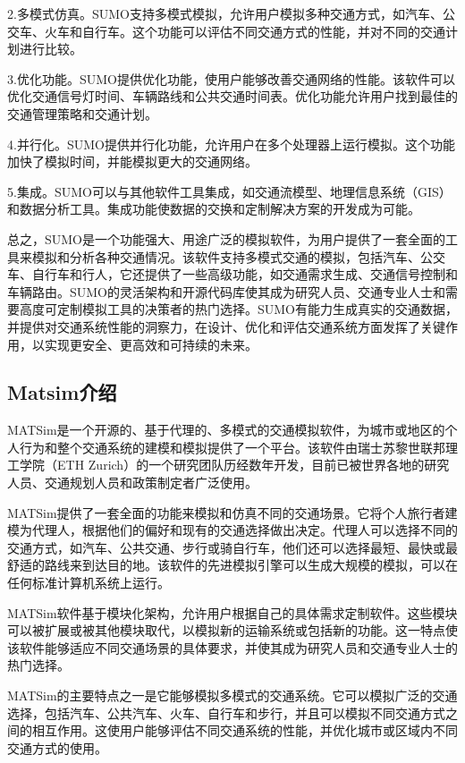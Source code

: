 2.多模式仿真。SUMO支持多模式模拟，允许用户模拟多种交通方式，如汽车、公交车、火车和自行车。这个功能可以评估不同交通方式的性能，并对不同的交通计划进行比较。

3.优化功能。SUMO提供优化功能，使用户能够改善交通网络的性能。该软件可以优化交通信号灯时间、车辆路线和公共交通时间表。优化功能允许用户找到最佳的交通管理策略和交通计划。

4.并行化。SUMO提供并行化功能，允许用户在多个处理器上运行模拟。这个功能加快了模拟时间，并能模拟更大的交通网络。

5.集成。SUMO可以与其他软件工具集成，如交通流模型、地理信息系统（GIS）和数据分析工具。集成功能使数据的交换和定制解决方案的开发成为可能。

总之，SUMO是一个功能强大、用途广泛的模拟软件，为用户提供了一套全面的工具来模拟和分析各种交通情况。该软件支持多模式交通的模拟，包括汽车、公交车、自行车和行人，它还提供了一些高级功能，如交通需求生成、交通信号控制和车辆路由。SUMO的灵活架构和开源代码库使其成为研究人员、交通专业人士和需要高度可定制模拟工具的决策者的热门选择。SUMO有能力生成真实的交通数据，并提供对交通系统性能的洞察力，在设计、优化和评估交通系统方面发挥了关键作用，以实现更安全、更高效和可持续的未来。

\subsection{Matsim介绍}

MATSim是一个开源的、基于代理的、多模式的交通模拟软件，为城市或地区的个人行为和整个交通系统的建模和模拟提供了一个平台。该软件由瑞士苏黎世联邦理工学院（ETH Zurich）的一个研究团队历经数年开发，目前已被世界各地的研究人员、交通规划人员和政策制定者广泛使用。

MATSim提供了一套全面的功能来模拟和仿真不同的交通场景。它将个人旅行者建模为代理人，根据他们的偏好和现有的交通选择做出决定。代理人可以选择不同的交通方式，如汽车、公共交通、步行或骑自行车，他们还可以选择最短、最快或最舒适的路线来到达目的地。该软件的先进模拟引擎可以生成大规模的模拟，可以在任何标准计算机系统上运行。

MATSim软件基于模块化架构，允许用户根据自己的具体需求定制软件。这些模块可以被扩展或被其他模块取代，以模拟新的运输系统或包括新的功能。这一特点使该软件能够适应不同交通场景的具体要求，并使其成为研究人员和交通专业人士的热门选择。

MATSim的主要特点之一是它能够模拟多模式的交通系统。它可以模拟广泛的交通选择，包括汽车、公共汽车、火车、自行车和步行，并且可以模拟不同交通方式之间的相互作用。这使用户能够评估不同交通系统的性能，并优化城市或区域内不同交通方式的使用。

